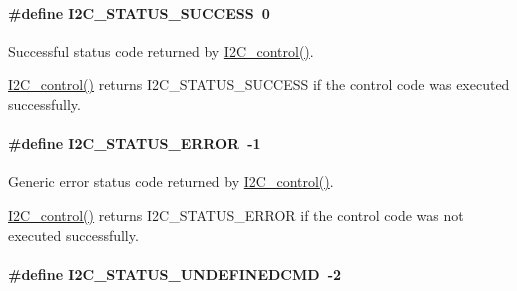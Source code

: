 \paragraph[{I2\+C\+\_\+\+S\+T\+A\+T\+U\+S\+\_\+\+S\+U\+C\+C\+E\+S\+S}]{\setlength{\rightskip}{0pt plus 5cm}\#define I2\+C\+\_\+\+S\+T\+A\+T\+U\+S\+\_\+\+S\+U\+C\+C\+E\+S\+S~0}\label{_i2_c_8h_aa0bcf3acd26ac82bd8ff91daba2c78c4}


Successful status code returned by \hyperlink{_i2_c_8h_a633003582213a5098467a4e647cc52f9}{I2\+C\+\_\+control()}. 

\hyperlink{_i2_c_8h_a633003582213a5098467a4e647cc52f9}{I2\+C\+\_\+control()} returns I2\+C\+\_\+\+S\+T\+A\+T\+U\+S\+\_\+\+S\+U\+C\+C\+E\+S\+S if the control code was executed successfully. 
\paragraph[{I2\+C\+\_\+\+S\+T\+A\+T\+U\+S\+\_\+\+E\+R\+R\+O\+R}]{\setlength{\rightskip}{0pt plus 5cm}\#define I2\+C\+\_\+\+S\+T\+A\+T\+U\+S\+\_\+\+E\+R\+R\+O\+R~-\/1}\label{_i2_c_8h_a7323fe57c39c46d0da9910e17f5f0b06}


Generic error status code returned by \hyperlink{_i2_c_8h_a633003582213a5098467a4e647cc52f9}{I2\+C\+\_\+control()}. 

\hyperlink{_i2_c_8h_a633003582213a5098467a4e647cc52f9}{I2\+C\+\_\+control()} returns I2\+C\+\_\+\+S\+T\+A\+T\+U\+S\+\_\+\+E\+R\+R\+O\+R if the control code was not executed successfully. 
\paragraph[{I2\+C\+\_\+\+S\+T\+A\+T\+U\+S\+\_\+\+U\+N\+D\+E\+F\+I\+N\+E\+D\+C\+M\+D}]{\setlength{\rightskip}{0pt plus 5cm}\#define I2\+C\+\_\+\+S\+T\+A\+T\+U\+S\+\_\+\+U\+N\+D\+E\+F\+I\+N\+E\+D\+C\+M\+D~-\/2}\label{_i2_c_8h_a11c31c9869ed2441789205d9e5967d66}



